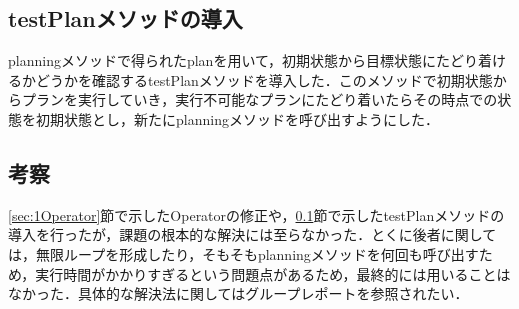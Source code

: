 \documentclass{jarticle}
\begin{document}
\subsection{testPlanメソッドの導入}
\label{sec:1Test}
planningメソッドで得られたplanを用いて，初期状態から目標状態にたどり着けるかどうかを確認するtestPlanメソッドを導入した．このメソッドで初期状態からプランを実行していき，実行不可能なプランにたどり着いたらその時点での状態を初期状態とし，新たにplanningメソッドを呼び出すようにした．

\subsection{考察}
\ref{sec:1Operator}節で示したOperatorの修正や，\ref{sec:1Test}節で示したtestPlanメソッドの導入を行ったが，課題の根本的な解決には至らなかった．とくに後者に関しては，無限ループを形成したり，そもそもplanningメソッドを何回も呼び出すため，実行時間がかかりすぎるという問題点があるため，最終的には用いることはなかった．具体的な解決法に関してはグループレポートを参照されたい．
\end{document}
